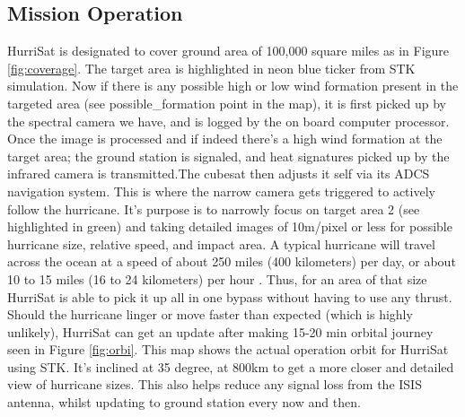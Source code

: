 \subsection{Mission Operation }
HurriSat is designated to cover ground area of 100,000 square miles as in Figure \ref{fig:coverage}. The target area is highlighted in neon blue ticker from STK \cite{AGISolutions2021} simulation. Now if there is any possible high or low wind  formation present in the targeted area (see possible\_formation point in the map),  it is first picked up by the spectral camera we have, and is logged by the on board computer processor. Once the image is processed and if indeed there's a high wind formation at the target area; the ground station is signaled, and heat signatures picked up by the infrared camera is transmitted.The cubesat then adjusts it self via its ADCS navigation system. This is where the narrow camera gets triggered to  actively follow the hurricane. It's purpose is to narrowly focus on target area 2 (see highlighted in green) and taking detailed images of 10m/pixel or less for possible hurricane size, relative speed, and impact area. A typical hurricane will travel across the ocean at a speed of about 250 miles (400 kilometers) per day, or about 10 to 15 miles (16 to 24 kilometers) per hour \cite{Sumanth2019}. Thus, for an area of that size HurriSat is able to pick it up all in one bypass without having to use any thrust.  Should the hurricane linger or move faster than expected (which is highly unlikely),  HurriSat can get an update after making 15-20 min orbital journey seen in Figure \ref{fig:orbi}. This map shows the actual operation orbit for HurriSat using STK.  It's inclined at 35 degree, at 800km to get a more closer and detailed view of hurricane sizes. This also helps reduce any signal loss from the ISIS antenna, whilst updating to ground station every now and then.
\FloatBarrier
